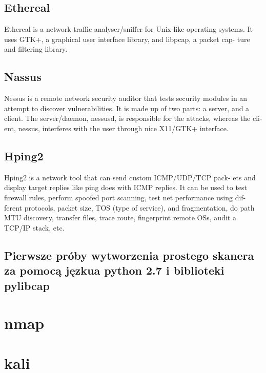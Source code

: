 \subsection{Ethereal}

Ethereal is a network traffic analyser/sniffer for Unix-like operating
systems. It uses GTK+, a graphical user interface library, and libpcap, a packet cap-
ture and filtering library.

\subsection{Nassus}

Nessus is a remote network security auditor that tests security modules
in an attempt to discover vulnerabilities. It is made up of two parts: a server, and a
client. The server/daemon, nessusd, is responsible for the attacks, whereas the cli-
ent, nessus, interferes with the user through nice X11/GTK+ interface.

\subsection{Hping2}

Hping2 is a network tool that can send custom ICMP/UDP/TCP pack-
ets and display target replies like ping does with ICMP replies. It can be used to
test firewall rules, perform spoofed port scanning, test net performance using dif-
ferent protocols, packet size, TOS (type of service), and fragmentation, do path
MTU discovery, transfer files, trace route, fingerprint remote OSs, audit a TCP/IP
stack, etc.


\subsection{Pierwsze próby wytworzenia prostego skanera za pomocą jęzkua python 2.7 i biblioteki pylibcap}

\section{nmap}

\section{kali}




